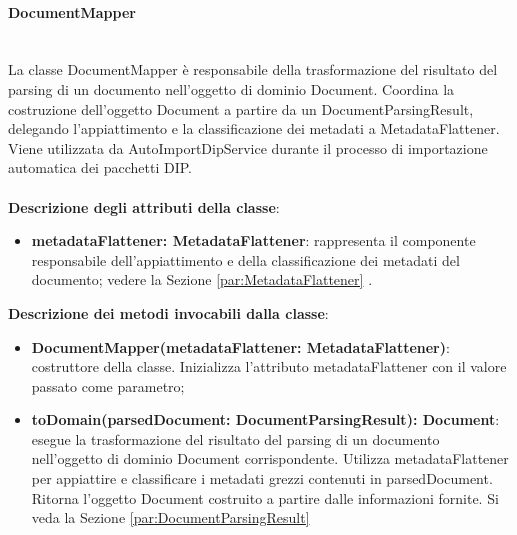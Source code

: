 \documentclass[a4paper,12pt]{article}
\begin{document}
{{{                \paragraph{DocumentMapper}\label{par:DocumentMapper}\mbox{}\\
                La classe DocumentMapper è responsabile della trasformazione del risultato del parsing di un documento nell'oggetto di dominio Document. Coordina la costruzione dell'oggetto Document a partire da un DocumentParsingResult, delegando l'appiattimento e la classificazione dei metadati a MetadataFlattener. Viene utilizzata da AutoImportDipService durante il processo di importazione automatica dei pacchetti DIP.\\
                \\
                \textbf{Descrizione degli attributi della classe}:
                \begin{itemize}
                    \item \textbf{metadataFlattener: MetadataFlattener}: rappresenta il componente responsabile dell'appiattimento e della classificazione dei metadati del documento; vedere la Sezione \ref{par:MetadataFlattener} .
                \end{itemize}
 
                \noindent \textbf{Descrizione dei metodi invocabili dalla classe}:
                \begin{itemize}
                    \item \textbf{DocumentMapper(metadataFlattener: MetadataFlattener)}: costruttore della classe. Inizializza l'attributo metadataFlattener con il valore passato come parametro;
                    \item \textbf{toDomain(parsedDocument: DocumentParsingResult): Document}: esegue la trasformazione del risultato del parsing di un documento nell'oggetto di dominio Document corrispondente. Utilizza metadataFlattener per appiattire e classificare i metadati grezzi contenuti in parsedDocument. Ritorna l'oggetto Document costruito a partire dalle informazioni fornite. Si veda la Sezione \ref{par:DocumentParsingResult}
                \end{itemize}
}}}
\end{document}
